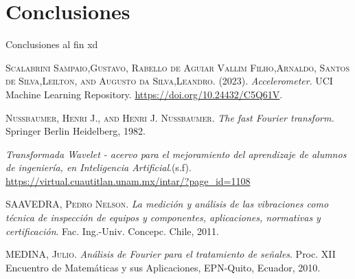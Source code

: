\documentclass[11pt,a4paper]{article}
\begin{document}
\section{Conclusiones}
Conclusiones al fin xd


\begin{thebibliography}{x}
	 \textsc{Scalabrini Sampaio,Gustavo, Rabello de Aguiar Vallim Filho,Arnaldo, Santos de Silva,Leilton, and Augusto da Silva,Leandro}. (2023). \textit{Accelerometer}. UCI Machine Learning Repository. \url{https://doi.org/10.24432/C5Q61V}.
	
	 \textsc{Nussbaumer, Henri J., and Henri J. Nussbaumer.} \textit{The fast Fourier transform.} Springer Berlin Heidelberg, 1982.
	
	 \textit{Transformada Wavelet - acervo para el mejoramiento del aprendizaje de alumnos de ingeniería, en Inteligencia Artificial}.(s.f). \url{https://virtual.cuautitlan.unam.mx/intar/?page\_id=1108}
	
	 \textsc{SAAVEDRA, Pedro Nelson}. \textit{La medición y análisis de las vibraciones como técnica de inspección de equipos y componentes, aplicaciones, normativas y certificación}. Fac. Ing.-Univ. Concepc. Chile, 2011.
	
	 \textsc{MEDINA, Julio}. \textit{Análisis de Fourier para el tratamiento de señales}. Proc. XII Encuentro de Matemáticas y sus Aplicaciones, EPN-Quito, Ecuador, 2010.
	
\end{thebibliography}
\end{document}
